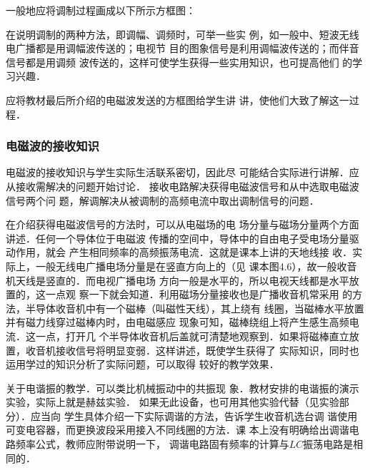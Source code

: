 一般地应将调制过程画成以下所示方框图：
\begin{center}
    \end{center}

在说明调制的两种方法，即调幅、调频时，可举一些实
例，如一般中、短波无线电广播都是用调幅波传送的；电视节
目的图象信号是利用调幅波传送的；而伴音信号都是用调频
波传送的，这样可使学生获得一些实用知识，也可提高他们
的学习兴趣．

应将教材最后所介绍的电磁波发送的方框图给学生讲
讲，使他们大致了解这一过程．

\subsubsection{电磁波的接收知识}

电磁波的接收知识与学生实际生活联系密切，因此尽
可能结合实际进行讲解．应从接收需解决的问题开始讨论．
接收电路解决获得电磁波信号和从中选取电磁波信号两个问
题，解调解决从被调制的高频电流中取出调制信号的问题．

在介绍获得电磁波信号的方法时，可以从电磁场的电
场分量与磁场分量两个方面讲述．任何一个导体位于电磁波
传播的空间中，导体中的自由电子受电场分量驱动作用，就会
产生相同频率的高频振荡电流．这就是课本上讲的天地线接
收．实际上，一般无线电广播电场分量是在竖直方向上的（见
课本图4.6），故一般收音机天线是竖直的．而电视广播电场
方向一般是水平的，所以电视天线都是水平放置的，这一点观
察一下就会知道．利用磁场分量接收也是广播收音机常采用
的方法，半导体收音机中有一个磁棒（叫磁性天线），其上绕有
线圈，当磁棒水平放置并有磁力线穿过磁棒内时，由电磁感应
现象可知，磁棒绕组上将产生感生高频电流．这一点，打开几
个半导体收音机后盖就可清楚地观察到．如果将磁棒直立放
置，收音机接收信号将明显变弱．这样讲述，既使学生获得了
实际知识，同时也运用学过的知识分析了实际问题，可以取得
较好的教学效果．

关于电谐振的教学．可以类比机械振动中的共振现
象．教材安排的电谐振的演示实验，实际上就是赫兹实验．
如果无此设备，也可用其他实验代替（见实验部分）．应当向
学生具体介绍一下实际调谐的方法，告诉学生收音机选台调
谐使用可变电容器，而更换波段采用接入不同线圈的方法．课
本上没有明确给出调谐电路频率公式，教师应附带说明一下，
调谐电路固有频率的计算与$LC$振荡电路是相同的．

